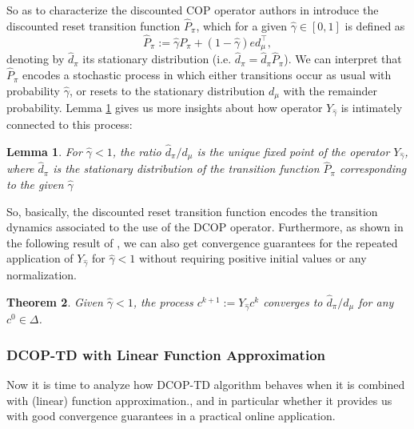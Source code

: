 \documentclass[12pt,a4paper,openright,twoside]{article}
\numberwithin{equation}{section}
\newtheorem{theorem}{Theorem}[section]
\newtheorem{lemma}[theorem]{Lemma}
\theoremstyle{definition}
\theoremstyle{remark}
\theoremstyle{plain}
\begin{document}
So as to characterize the discounted COP operator authors in \cite{DCOPTD} introduce the discounted reset transition function $\hat{P}_\pi$, which for a given $\hat{\gamma}\in [0,1]$ is defined as
\begin{equation*}
		\hat{P}_\pi := \hat{\gamma} P_\pi + (1 - \hat{\gamma})ed_\mu^\top,
\end{equation*}
denoting by $\hat{d}_\pi$ its stationary distribution (i.e. $\hat{d}_\pi = \hat{d}_\pi \hat{P}_\pi$).
We can interpret that $\hat{P}_\pi$ encodes a stochastic process in which either transitions occur as usual with probability $\hat{\gamma}$, or resets to the stationary distribution $d_\mu$ with the remainder probability. %
Lemma \ref{fixedPointDCOPTD} gives us more insights about how operator $Y_{\hat{\gamma}}$ is intimately connected to this process:

\begin{lemma} \label{fixedPointDCOPTD}
	For $\hat{\gamma}<1$, the ratio $\hat{d}_\pi / d_\mu$ is the unique fixed point of the operator $Y_{\hat{\gamma}}$, where $\hat{d}_\pi$ is the stationary distribution of the transition function $\hat{P}_\pi$ corresponding to the given $\hat{\gamma}$
\end{lemma}

So, basically, the discounted reset transition function encodes the transition dynamics associated to the use of the DCOP operator. Furthermore, as shown in the following result of \cite{DCOPTD}, we can also get convergence guarantees for the repeated application of $Y_{\hat{\gamma}}$ for $\hat{\gamma} < 1$ without requiring positive initial values or any normalization.

\begin{theorem}
	Given $\hat{\gamma} < 1$, the process $c^{k+1} := Y_{\hat{\gamma}} c^k$ converges to $\hat{d}_\pi / d_\mu$ for any $c^0 \in \Delta$.
\end{theorem}



\subsubsection*{DCOP-TD with Linear Function Approximation}

Now it is time to analyze how DCOP-TD algorithm behaves when it is combined with (linear) function approximation., and in particular whether it provides us with good convergence guarantees in a practical online application.
\end{document}

